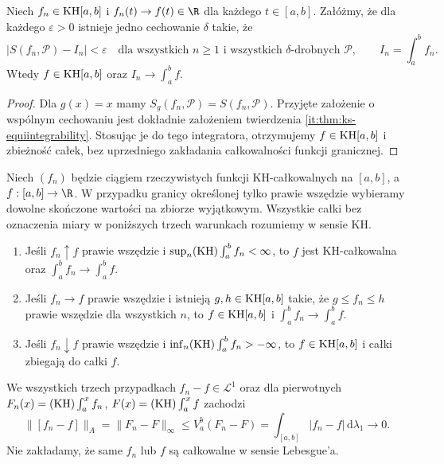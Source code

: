 \begin{twierdzenie}
\label{ma1:kh:thm:kh-equiintegrability}\label{it:thm:kh-equiintegrability}
Niech $f_n\in\mathrm{KH}[a,b]$ i $f_n(t)\to f(t)\in\R$ dla każdego $t\in[a,b]$. Załóżmy, że dla każdego $\varepsilon>0$ istnieje jedno cechowanie $\delta$ takie, że
\[
 |S(f_n,\mathcal P)-I_n|<\varepsilon
 \quad\text{dla wszystkich }n\ge1
 \text{ i wszystkich }\delta\text{-drobnych }\mathcal P,
 \qquad I_n=\int_a^b f_n.
\]
Wtedy $f\in\mathrm{KH}[a,b]$ oraz $I_n\to\int_a^b f$.
\end{twierdzenie}
\begin{proof}
Dla $g(x)=x$ mamy $S_g(f_n,\mathcal P)=S(f_n,\mathcal P)$.
Przyjęte założenie o wspólnym cechowaniu jest dokładnie
założeniem twierdzenia \ref{it:thm:ks-equiintegrability}.
Stosując je do tego integratora, otrzymujemy
$f\in\mathrm{KH}[a,b]$ i zbieżność całek, bez uprzedniego
zakładania całkowalności funkcji granicznej.
\end{proof}
\begin{twierdzenie}\label{ma1:kh:thm:kh-order-limits}\label{it:thm:hk-limit-theorems}
Niech $(f_n)$ będzie ciągiem rzeczywistych funkcji
KH-całkowalnych na $[a,b]$, a $f:[a,b]\to\R$.
W przypadku granicy określonej tylko prawie wszędzie
wybieramy dowolne skończone wartości na zbiorze
wyjątkowym. Wszystkie całki bez oznaczenia miary
w poniższych trzech warunkach rozumiemy w sensie KH.
\begin{enumerate}[label=(\alph*)]
\item Jeśli $f_n\uparrow f$ prawie wszędzie i $\sup_n(\mathrm{KH})\int_a^b f_n<\infty$, to $f$ jest KH-całkowalna oraz $\int_a^b f_n\to\int_a^b f$.
\item Jeśli $f_n\to f$ prawie wszędzie i istnieją $g,h\in\mathrm{KH}[a,b]$ takie, że $g\le f_n\le h$ prawie wszędzie dla wszystkich $n$, to $f\in\mathrm{KH}[a,b]$ i $\int_a^b f_n\to\int_a^b f$.
\item Jeśli $f_n\downarrow f$ prawie wszędzie i
$\inf_n(\mathrm{KH})\int_a^b f_n>-\infty$, to $f\in\mathrm{KH}[a,b]$
i całki zbiegają do całki $f$.
\end{enumerate}
We wszystkich trzech przypadkach $f_n-f\in\mathcal L^1$
oraz dla pierwotnych $F_n(x)=(\mathrm{KH})\int_a^x f_n$,
$F(x)=(\mathrm{KH})\int_a^x f$ zachodzi
\[
 \|[f_n-f]\|_A
 =\|F_n-F\|_\infty
 \le V_a^b(F_n-F)
 =\int_{[a,b]}|f_n-f|\,\mathrm d\lambda_1\longrightarrow0.
\]
Nie zakładamy, że same $f_n$ lub $f$ są całkowalne
w sensie Lebesgue'a.
\end{twierdzenie}
